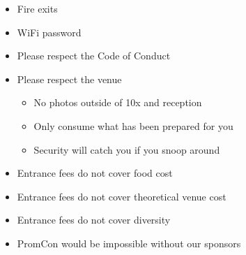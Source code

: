\documentclass[t]{beamer}
\begin{document}
\begin{frame}
	\vfill
	\begin{itemize}
		\item Fire exits
		\item WiFi password
		\item Please respect the Code of Conduct
		\item Please respect the venue
		\begin{itemize}
			\item No photos outside of 10x and reception
			\item Only consume what has been prepared for you
			\item Security will catch you if you snoop around
		\end{itemize}
	\end{itemize}
	\vfill
\end{frame}

\begin{frame}
	\vfill
	\begin{itemize}
		\item Entrance fees do not cover food cost
		\item Entrance fees do not cover theoretical venue cost
		\item Entrance fees do not cover diversity
		\item PromCon would be impossible without our sponsors
	\end{itemize}
	\vfill
\end{frame}

%
%
%
%
%
\end{document}
